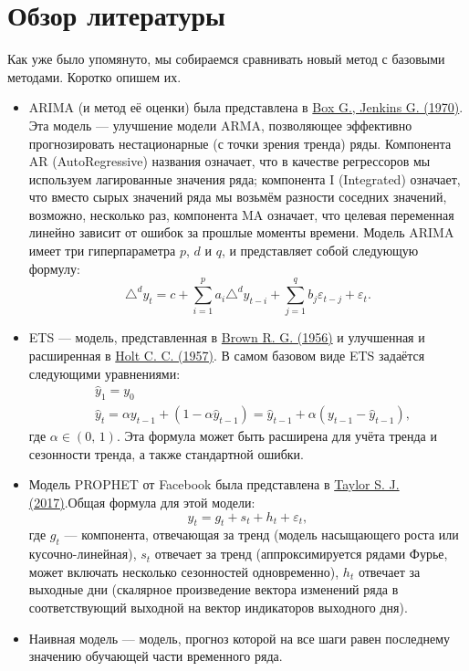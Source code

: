 \documentclass[a4paper,14pt]{extarticle}
\newcommand{\bibref}[3]{\hyperlink{#1}{#2 (#3)}} %
\begin{document}
\section{Обзор литературы}
Как уже было упомянуто, мы собираемся сравнивать новый метод с базовыми методами. Коротко опишем их.
\begin{itemize}
	\item ARIMA (и метод её оценки) была представлена в \bibref{box70}{Box G., Jenkins G.}{1970}. Эта модель — улучшение модели ARMA, позволяющее эффективно прогнозировать нестационарные (с точки зрения тренда) ряды. Компонента AR (AutoRegressive) названия означает, что в качестве регрессоров мы используем лагированные значения ряда; компонента I (Integrated) означает, что вместо сырых значений ряда мы возьмём разности соседних значений, возможно, несколько раз, компонента MA означает, что целевая переменная линейно зависит от ошибок за прошлые моменты времени. Модель ARIMA имеет три гиперпараметра $p$, $d$ и $q$, и представляет собой следующую формулу:
	\begin{equation*}
		\triangle^{d} y_t = c + \sum_{i=1}^p a_i \triangle^d y_{t-i} + \sum_{j=1}^q b_j \varepsilon_{t-j} + \varepsilon_t.
	\end{equation*}
	\item ETS --- модель, представленная в \bibref{brown56}{Brown R. G.}{1956} и улучшенная и расширенная в \bibref{holt57}{Holt C. C.}{1957}. В самом базовом виде ETS задаётся следующими уравнениями:
	\begin{align*}
		&\hat{y}_1 = y_0 \\
		&\hat{y}_t = \alpha y_{t-1} + (1 - \alpha \hat{y}_{t-1}) = \hat{y}_{t-1} + \alpha(y_{t-1} - \hat{y}_{t-1}),
	\end{align*}
	где $\alpha \in (0,\,1)$. Эта формула может быть расширена для учёта тренда и сезонности тренда, а также стандартной ошибки.
	\item Модель PROPHET от Facebook была представлена в \bibref{taylor17}{Taylor S. J.}{2017}.Общая формула для этой модели:
	\begin{equation*}
		y_t = g_t + s_t + h_t + \varepsilon_t,
	\end{equation*}
	где $g_t$ --- компонента, отвечающая за тренд (модель насыщающего роста или кусочно-линейная), $s_t$ отвечает за тренд (аппроксимируется рядами Фурье, может включать несколько сезонностей одновременно), $h_t$ отвечает за выходные дни (скалярное произведение вектора изменений ряда в соответствующий выходной на вектор индикаторов выходного дня).
 	\item Наивная модель --- модель, прогноз которой на все шаги равен последнему значению обучающей части временного ряда.
\end{itemize}
\end{document}
